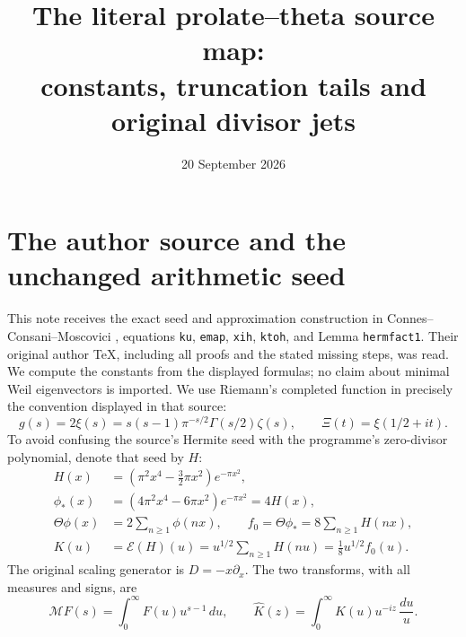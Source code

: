 \documentclass[11pt]{article}
\title{The literal prolate--theta source map:\\constants, truncation tails and original divisor jets}
\author{}\date{20 September 2026}
\newcommand{\M}{\mathcal M}\newcommand{\E}{\mathcal E}
\begin{document}
\maketitle

\section{The author source and the unchanged arithmetic seed}
This note receives the exact seed and approximation construction in
Connes--Consani--Moscovici \cite{CCM}, equations \texttt{ku},
\texttt{emap}, \texttt{xih}, \texttt{ktoh}, and Lemma
\texttt{hermfact1}. Their original author TeX, including all proofs
and the stated missing steps, was read. We compute the constants from
the displayed formulas; no claim about minimal Weil eigenvectors is
imported. We use Riemann's completed function in precisely the
convention displayed in that source:
\begin{equation}\tag{PT1}
 g(s)=2\xi(s)=s(s-1)\pi^{-s/2}\Gamma(s/2)\zeta(s),\qquad
 \Xi(t)=\xi(1/2+it).
\end{equation}
To avoid confusing the source's Hermite seed with the programme's
zero-divisor polynomial, denote that seed by $H$:
\begin{equation}\tag{PT2}
 \begin{split}
 H(x)&=(\pi^2x^4-\tfrac32\pi x^2)e^{-\pi x^2},\\
 \phi_*(x)&=(4\pi^2x^4-6\pi x^2)e^{-\pi x^2}=4H(x),\\
 \Theta\phi(x)&=2\sum_{n\geq1}\phi(nx),\qquad
 f_0=\Theta\phi_*=8\sum_{n\geq1}H(nx),\\
 K(u)&=\E(H)(u)=u^{1/2}\sum_{n\geq1}H(nu)
                   =\tfrac18u^{1/2}f_0(u).
 \end{split}
\end{equation}
The original scaling generator is $D=-x\partial_x$.
The two transforms, with all measures and signs, are
\begin{equation}\tag{PT3}
 \M F(s)=\int_0^\infty F(u)u^{s-1}\,du,\qquad
 \widehat K(z)=\int_0^\infty K(u)u^{-iz}\,\frac{du}{u}.
\end{equation}
\end{document}
